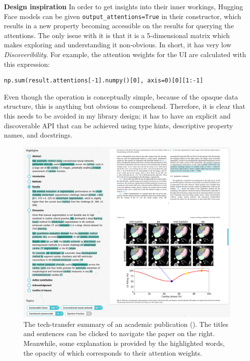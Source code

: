 \begin{displayquote}
\textbf{Design inspiration} In order to get insights into their inner workings, Hugging Face models can be given \texttt{output\_attentions=True} in their constructor, which results in a new property becoming accessible on the results for querying the attentions. The only issue with it is that it is a 5-dimensional matrix which makes exploring and understanding it non-obvious. In short, it has very low \textit{Discoveribility}. For example, the attention weights for the UI are calculated with this expression:
\begin{verbatim}
np.sum(result.attentions[-1].numpy()[0], axis=0)[0][1:-1]
\end{verbatim}
Even though the operation is conceptually simple, because of the opaque data structure, this is anything but obvious to comprehend. Therefore, it is clear that this needs to be avoided in my library design; it has to have an explicit and discoverable API that can be achieved using type hints, descriptive property names, and docstrings.
\end{displayquote}

\begin{figure}
    \centering
    \includegraphics[width=1\linewidth]{figures/dashboard-highlights.png}
    \captionsetup{width=.9\linewidth}
    \caption{The tech-transfer summary of an academic publication (\cite{bruns2022deep}). The titles and sentences can be clicked to navigate the paper on the right. Meanwhile, some explanation is provided by the highlighted words, the opacity of which corresponds to their attention weights.}
    \label{fig:dashboard-highlights}
\end{figure}


